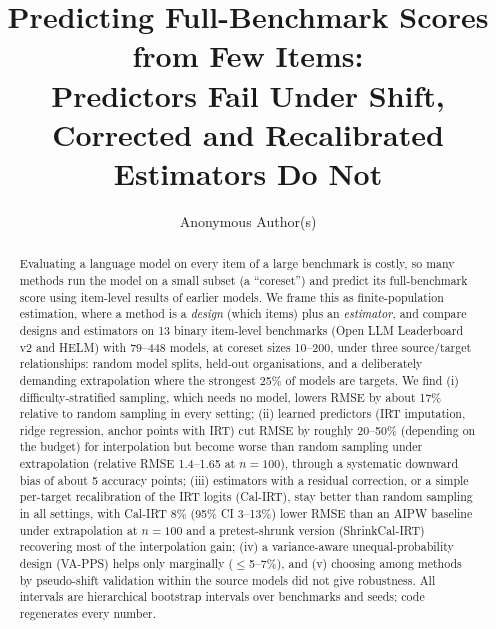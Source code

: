 \documentclass{article}
\title{Predicting Full-Benchmark Scores from Few Items: \\ Predictors Fail Under Shift, Corrected and Recalibrated Estimators Do Not}
\author{Anonymous Author(s)}
\begin{document}
\maketitle

\begin{abstract}
Evaluating a language model on every item of a large benchmark is costly, so many methods run the model on a small subset (a ``coreset'') and predict its full-benchmark score using item-level results of earlier models. We frame this as finite-population estimation, where a method is a \emph{design} (which items) plus an \emph{estimator}, and compare designs and estimators on 13 binary item-level benchmarks (Open LLM Leaderboard v2 and HELM) with 79--448 models, at coreset sizes 10--200, under three source/target relationships: random model splits, held-out organisations, and a deliberately demanding extrapolation where the strongest 25\% of models are targets. We find (i) difficulty-stratified sampling, which needs no model, lowers RMSE by about 17\% relative to random sampling in every setting; (ii) learned predictors (IRT imputation, ridge regression, anchor points with IRT) cut RMSE by roughly 20--50\% (depending on the budget) for interpolation but become worse than random sampling under extrapolation (relative RMSE 1.4--1.65 at $n=100$), through a systematic downward bias of about 5 accuracy points; (iii) estimators with a residual correction, or a simple per-target recalibration of the IRT logits (Cal-IRT), stay better than random sampling in all settings, with Cal-IRT 8\% (95\% CI 3--13\%) lower RMSE than an AIPW baseline under extrapolation at $n=100$ and a pretest-shrunk version (ShrinkCal-IRT) recovering most of the interpolation gain; (iv) a variance-aware unequal-probability design (VA-PPS) helps only marginally ($\le$5--7\%), and (v) choosing among methods by pseudo-shift validation within the source models did not give robustness. All intervals are hierarchical bootstrap intervals over benchmarks and seeds; code regenerates every number.
\end{abstract}













\newpage

\end{document}
